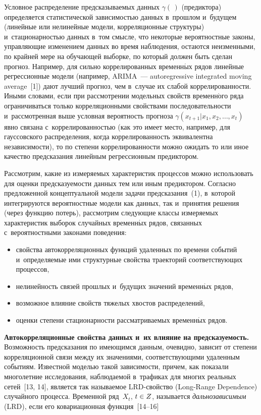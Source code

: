\begin{multicols}{2}
  Условное распределение предсказываемых данных $\gamma (\,)$ 
(предиктора) определяется статистической зависимостью данных в~прошлом 
и~будущем (линейные или нелинейные модели, корреляционные структуры) 
и~стационарностью данных в~том смыс\-ле, что некоторые вероятностные 
законы, управ\-ля\-ющие изменением данных во время наблюдения, остаются 
неизменными, по крайней мере на обуча\-ющей выборке, по который должен 
быть сделан прогноз. Например, для сильно коррелированных временн$\acute{\mbox{ы}}$х 
рядов линейные регрессионные модели (например, ARIMA~--- autoregressive integrated moving average~[1]) дают 
лучший прогноз, чем в~случае их слабой коррелированности. Иными 
словами, если при рассмотрении модельных свойств временн$\acute{\mbox{о}}$го ряда 
ограничиваться только корреляционными свойствами последовательности 
и~рассмотренная выше условная вероятность прогноза $\gamma(x_{t+1}\vert  
x_1, x_2, \ldots, x_t)$ явно связана с~коррелированностью (как это имеет место, 
например, для гауссовского распределения, когда коррелированность 
эквивалентна независимости), то по степени коррелированности можно 
ожидать то или иное качество предсказания линейным регрессионным 
пре\-дик\-тором.

  
  Рассмотрим, какие из измеряемых характеристик процессов можно 
использовать для оценки предсказуемости данных тем или иным 
предиктором. Согласно предложенной концептуальной модели задачи 
предсказания~(1), в~которой интегрируются вероятностные модели как 
данных, так и~принятия решения (через функцию потерь), рассмотрим 
следующие классы измеряемых характеристик выборок случайных 
временн$\acute{\mbox{ы}}$х рядов, связанных с~вероятностными законами поведения: 
  \begin{itemize}
\item свойства автокорреляционных функций удаленных по времени 
событий и~определяемые ими структурные свойства траекторий 
соответствующих процессов,
\item нелинейность связей прошлых и~будущих значений временн$\acute{\mbox{ы}}$х рядов, 
\item возможное влияние свойств тяжелых хвостов распределений,
\item оценки степени стационарности рас\-смат\-ри\-ва\-емых временн$\acute{\mbox{ы}}$х рядов.
\end{itemize}

  \textbf{Автокорреляционные свойства данных и~их влияние на 
предсказуемость.} Возможность предсказания по имеющимся данным, 
очевидно, зависит от степени корреляционной связи между их значениями, 
соответствующими удаленным событиям. Известной моделью такой 
зависимости, причем, как показали многолетние исследования, наблюдаемой 
в~трафиках для многих реальных сетей~[13, 14], является так называемое  
LRD-свойст\-во (Long-Range Dependence) случайного процесса. Временной 
ряд~$X_t$, $t\hm\in Z$, называется \textit{дальнозависимым} (LRD), если его 
ковариационная функция~[14--16] 


\end{multicols}

